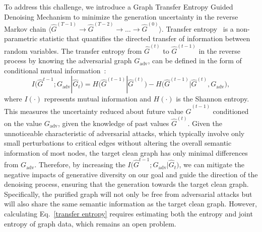 To address this challenge, we introduce a Graph Transfer Entropy Guided Denoising Mechanism to minimize the generation uncertainty in the reverse Markov chain $\langle\hat{G}^{(T-1)} \rightarrow \hat{G}^{(T-2)} \rightarrow \dots \rightarrow \hat{G}^{(0)}\rangle$. Transfer entropy~\cite{schreiber2000measuring} is a non-parametric statistic that quantifies the directed transfer of information between random variables. The transfer entropy from $\hat{G}^{(t)}$ to $\hat{G}^{(t-1)}$ in the reverse process by knowing the adversarial graph $G_{\text{adv}}$, can be defined in the form of conditional mutual information~\cite{wyner1978definition}:
\begin{equation}
\label{transfer entropy}
    I\big(\hat{G}^{t-1}; G_{\text{adv}}| \hat{G}_{t}\big) = 
    H\big(\hat{G}^{(t-1)}|\hat{G}^{(t)}\big) - H\big(\hat{G}^{(t-1)}|\hat{G}^{(t)}, G_{\text{adv}}\big),
\end{equation}
where $I(\cdot)$ represents mutual information and $H(\cdot)$ is the Shannon entropy.
This measures the uncertainty reduced about future value $\hat{G}^{(t-1)}$ conditioned on the value $G_{\text{adv}}$, given the knowledge of past values $\hat{G}^{(t)}$.
Given the unnoticeable characteristic of adversarial attacks, which typically involve only small perturbations to critical edges without altering the overall semantic information of most nodes, the target clean graph has only minimal differences from $G_{\text{adv}}$.
Therefore, by increasing the $I\big(\hat{G}^{t-1}; G_{\text{adv}}| \hat{G}_{t}\big)$, we can mitigate the negative impacts of generative diversity on our goal and guide the direction of the denoising process, ensuring that the generation towards the target clean graph. Specifically, the purified graph will not only be free from adversarial attacks but will also share the same semantic information as the target clean graph. However, calculating Eq.~\eqref{transfer entropy} requires estimating both the entropy and joint entropy of graph data, which remains an open problem.

